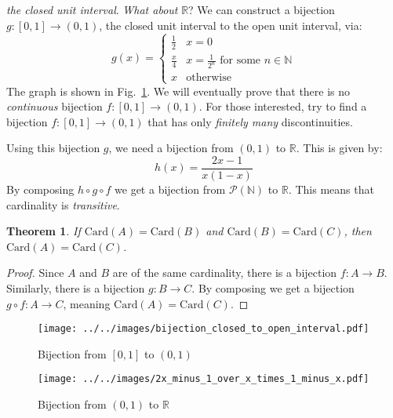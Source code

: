 \documentclass{article}
\theoremstyle{plain}
\newtheorem{theorem}{Theorem}[section]
\theoremstyle{normal}
\begin{document}
        \textit{the closed unit interval}. \textit{What about} $\mathbb{R}$?
        We can construct a bijection $g:[0,1]\rightarrow(0,1)$, the closed
        unit interval to the open unit interval, via:
        \begin{equation}
            g(x)=
            \begin{cases}
                \frac{1}{2}&x=0\\
                \frac{x}{4}&x=\frac{1}{2^{n}}\textrm{ for some }n\in\mathbb{N}\\
                x&\textrm{otherwise}
            \end{cases}
        \end{equation}
        The graph is shown in Fig.~\ref{fig:bijection_closed_to_open_interval}.
        We will eventually prove that there is no \textit{continuous} bijection
        $f:[0,1]\rightarrow(0,1)$. For those interested, try to find a
        bijection $f:[0,1]\rightarrow(0,1)$ that has only
        \textit{finitely many} discontinuities.
        \par\hfill\par
        Using this bijection $g$, we need a bijection from $(0,1)$ to
        $\mathbb{R}$. This is given by:
        \begin{equation}
            h(x)=\frac{2x-1}{x(1-x)}
        \end{equation}
        By composing $h\circ{g}\circ{f}$ we get a bijection from
        $\mathcal{P}(\mathbb{N})$ to $\mathbb{R}$. This means that cardinality
        is \textit{transitive}.
        \begin{theorem}
            If $\textrm{Card}(A)=\textrm{Card}(B)$ and
            $\textrm{Card}(B)=\textrm{Card}(C)$, then
            $\textrm{Card}(A)=\textrm{Card}(C)$.
        \end{theorem}
        \begin{proof}
            Since $A$ and $B$ are of the same cardinality, there is a
            bijection $f:A\rightarrow{B}$. Similarly, there is a bijection
            $g:B\rightarrow{C}$. By composing we get a bijection
            $g\circ{f}:A\rightarrow{C}$, meaning
            $\textrm{Card}(A)=\textrm{Card}(C)$.
        \end{proof}
        \begin{figure}
            \centering
            \texttt{[image: ../../images/bijection\_closed\_to\_open\_interval.pdf]}
            \caption{Bijection from $[0,1]$ to $(0,1)$}
            \label{fig:bijection_closed_to_open_interval}
        \end{figure}
        \begin{figure}
            \centering
            \texttt{[image: ../../images/2x\_minus\_1\_over\_x\_times\_1\_minus\_x.pdf]}
            \caption{Bijection from $(0,1)$ to $\mathbb{R}$}
            \label{fig:2x_minus_1_over_x_times_1_minus_x}
        \end{figure}
\end{document}
